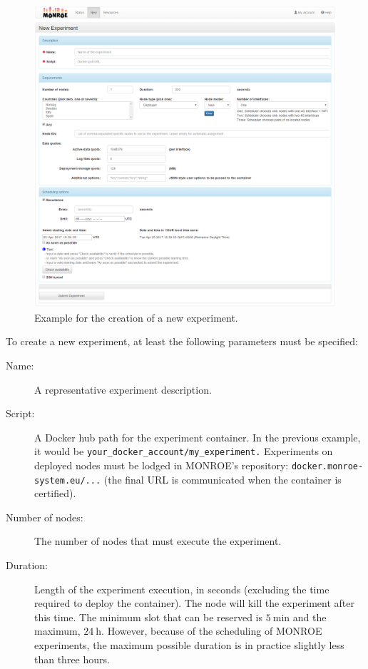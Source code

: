 \documentclass[a4paper,10pt]{article}
\newcommand{\monroe}{MONROE}
\newcommand{\identifier}[1]{{\texttt{\small{#1}}}}
\begin{document}
\begin{figure}[tp]
	\centering
	\includegraphics[width=1.0\textwidth]{NewExperiment_blank.png}
	\caption{Example for the creation of a new experiment.}
	\label{fig:newExperimentBlank}
\end{figure}

To create a new experiment, at least the following parameters must be specified:
\begin{description}
	\item [Name:] A representative experiment description.
	\item [Script:] A Docker hub path for the experiment container. In the previous example, it would be \identifier{your\_\allowbreak docker\_\allowbreak account/my\_\allowbreak experiment.} Experiments on deployed nodes must be lodged in \monroe{}'s repository: \identifier{docker.monroe-system.eu/...} (the final URL is communicated when the container is certified).
	\item [Number of nodes:] The number of nodes that must execute the experiment.
	\item [Duration:] Length of the experiment execution, in seconds (excluding the time required to deploy the container).
	The node will kill the experiment after this time. The minimum slot that can be reserved is $\SI{5}{\minute}$ and the maximum, $\SI{24}{\hour}$. However, because of the scheduling of \monroe{} experiments, the maximum possible duration is in practice slightly less than three hours.
\end{description}
\end{document}
